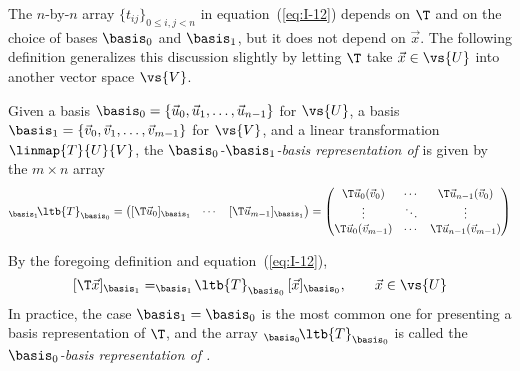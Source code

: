 The $n$-by-$n$ array $\{t_{ij}\}_{0\leq i,j <n}$ in equation~(\ref{eq:I-12})
depends on $\T$ and on the choice of bases $\basis_0$ and $\basis_1$, but it
does not depend on $\vec{x}$.  The following definition generalizes this
discussion slightly by letting $\T$ take $\vec{x}\in \vs{U}$ into another
vector space $\vs{V}$.
\begin{definition}\label{def:basis-rep-T}
Given a basis $\basis_0 = \{\vec{u}_0, \vec{u}_1, \ldots, \vec{u}_{n-1}\}$ for
$\vs{U}$, a basis $\basis_1 = \{\vec{v}_0, \vec{v}_1, \ldots, \vec{v}_{m-1}\}$ for
$\vs{V}$, and a linear transformation $\linmap{T}{U}{V}$, the \emph{$\basis_0$-$\basis_1$-basis
  representation of \T} is given by the $m \times n$ array
\[
_{\basis_1}\!\ltb{T}_{\basis_0} = 
  \begin{pmatrix} [\T\vec{u}_0]_{\basis_1}& \cdots & [\T\vec{u}_{m-1}]_{\basis_1} \end{pmatrix}
= \begin{pmatrix}
    \T\vec{u}_0(\vec{v}_0) & \cdots & \T\vec{u}_{n-1}(\vec{v}_0) \\ 
    \vdots & \ddots & \vdots \\
    \T\vec{u}_0(\vec{v}_{m-1}) & \cdots & \T\vec{u}_{n-1}(\vec{v}_{m-1})
  \end{pmatrix}
\]
\end{definition}
By the foregoing definition and equation~(\ref{eq:I-12}),
\begin{equation}\label{eq:P-11}
[\T\vec{x}]_{\basis_1} = _{\basis_1}\!\ltb{T}_{\basis_0}\, [\vec{x}]_{\basis_0},\qquad \vec{x}\in \vs{U}
\end{equation}
In practice, the case $\basis_1=\basis_0$ is the most common one for
presenting a basis representation of $\T$, and the array
$_{\basis_0}\!\ltb{T}_{\basis_0}$ is called the  
\emph{$\basis_0$-basis representation of \T.}

